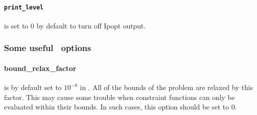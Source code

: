 \paragraph{\tt print\_level} is set to $0$ by default to turn off Ipopt output.
\subsubsection{Some useful \Ipopt\ options}
\paragraph{bound\_relax\_factor} is by default set to $10^{-8}$ in \Ipopt. All of the bounds
of the problem are relaxed by this factor. This may cause some trouble
when constraint functions can only be evaluated within their bounds.
In such cases, this
option should be set to 0.
